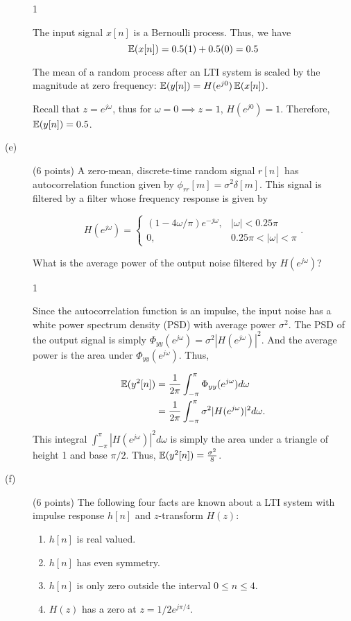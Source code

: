 \documentclass[10pt]{article}
\def\SOLUTIONS{0} %
\def\SolutionsColor{red2}
\begin{document}
\begin{description}
\if\SOLUTIONS1
{\color{\SolutionsColor} 
	The input signal $x[n]$ is a Bernoulli process. Thus, we have
	\begin{equation}
		\operatorname{\mathbb{E}}(x[n]) = 0.5(1) + 0.5(0) = 0.5
	\end{equation}
	
	The mean of a random process after an LTI system is scaled by the magnitude at zero frequency: $\operatorname{\mathbb{E}}(y[n]) = H(e^{j0})\operatorname{\mathbb{E}}(x[n])$.
	
	Recall that $z = e^{j\omega}$, thus for $\omega = 0 \implies z = 1$, $H(e^{j0}) = 1$. Therefore, $\operatorname{\mathbb{E}}(y[n]) = 0.5$.
}
\else\vspace{5cm}
\fi

%
\item[(e)] (6 points) A zero-mean, discrete-time random signal $r[n]$ has autocorrelation function given by $\phi_{rr}[m] = \sigma^2\delta[m]$. This signal is filtered by a filter whose frequency response is given by

\begin{equation}
	H(e^{j\omega}) = \begin{cases}
	(1 - 4\omega/\pi)e^{-j\omega}, & |\omega| < 0.25\pi \\
	0, & 0.25\pi < |\omega| < \pi
	\end{cases}.
\end{equation}

What is the average power of the output noise filtered by $H(e^{j\omega})$?

\if\SOLUTIONS1
{\color{\SolutionsColor} 
	Since the autocorrelation function is an impulse, the input noise has a white power spectrum density (PSD) with average power $\sigma^2$. The PSD of the output signal is simply $\Phi_{yy}(e^{j\omega}) = \sigma^2|H(e^{j\omega})|^2$. And the average power is the area under $\Phi_{yy}(e^{j\omega})$. Thus,
	
	\begin{align}
		\operatorname{\mathbb{E}}(y^2[n]) &= \frac{1}{2\pi}\int_{-\pi}^{\pi} \Phi_{yy}(e^{j\omega})d\omega \\
		&= \frac{1}{2\pi}\int_{-\pi}^{\pi} \sigma^2|H(e^{j\omega})|^2 d\omega.
	\end{align}
	This integral $\int_{-\pi}^{\pi} |H(e^{j\omega})|^2 d\omega$ is simply the area under a triangle of height 1 and base $\pi/2$. Thus, $\operatorname{\mathbb{E}}(y^2[n]) = \frac{\sigma^2}{8}$.
}
\else\vspace{6cm}
\fi

\item[(f)] (6 points) The following four facts are known about a LTI system with impulse response $h[n]$ and $z$-transform $H(z)$:
\begin{enumerate}[i]
	\item $h[n]$ is real valued.
	\item $h[n]$ has even symmetry.
	\item $h[n]$ is only zero outside the interval $0 \leq n \leq 4$.
	\item $H(z)$ has a zero at $z = 1/2e^{j\pi/4}$.
\end{enumerate}


\end{description}
\end{document}
